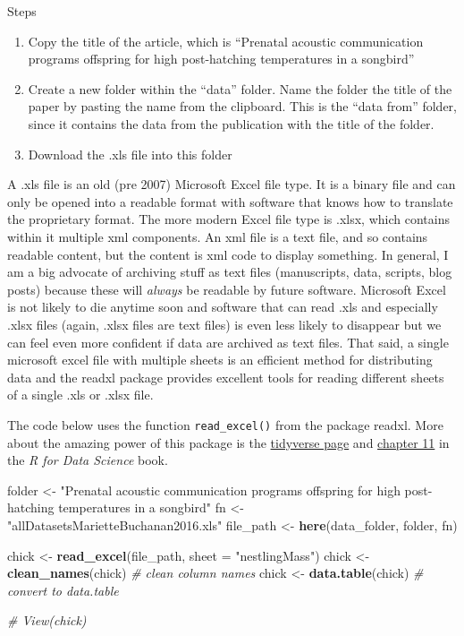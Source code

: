 \documentclass[]{book}
\newenvironment{Shaded}{\begin{snugshade}}{\end{snugshade}}
\newcommand{\CommentTok}[1]{\textcolor[rgb]{0.56,0.35,0.01}{\textit{#1}}}
\newcommand{\DataTypeTok}[1]{\textcolor[rgb]{0.13,0.29,0.53}{#1}}
\newcommand{\KeywordTok}[1]{\textcolor[rgb]{0.13,0.29,0.53}{\textbf{#1}}}
\newcommand{\NormalTok}[1]{#1}
\newcommand{\StringTok}[1]{\textcolor[rgb]{0.31,0.60,0.02}{#1}}
\providecommand{\tightlist}{%
  \setlength{\itemsep}{0pt}\setlength{\parskip}{0pt}}
\begin{document}
Steps

\begin{enumerate}
\def\labelenumi{\arabic{enumi}.}
\tightlist
\item
  Copy the title of the article, which is ``Prenatal acoustic communication programs offspring for high post-hatching temperatures in a songbird''
\item
  Create a new folder within the ``data'' folder. Name the folder the title of the paper by pasting the name from the clipboard. This is the ``data from'' folder, since it contains the data from the publication with the title of the folder.
\item
  Download the .xls file into this folder
\end{enumerate}

A .xls file is an old (pre 2007) Microsoft Excel file type. It is a binary file and can only be opened into a readable format with software that knows how to translate the proprietary format. The more modern Excel file type is .xlsx, which contains within it multiple xml components. An xml file is a text file, and so contains readable content, but the content is xml code to display something. In general, I am a big advocate of archiving stuff as text files (manuscripts, data, scripts, blog posts) because these will \emph{always} be readable by future software. Microsoft Excel is not likely to die anytime soon and software that can read .xls and especially .xlsx files (again, .xlsx files are text files) is even less likely to disappear but we can feel even more confident if data are archived as text files. That said, a single microsoft excel file with multiple sheets is an efficient method for distributing data and the readxl package provides excellent tools for reading different sheets of a single .xls or .xlsx file.

The code below uses the function \texttt{read\_excel()} from the package readxl. More about the amazing power of this package is the \href{https://readxl.tidyverse.org}{tidyverse page} and \href{http://r4ds.had.co.nz/data-import.html}{chapter 11} in the \emph{R for Data Science} book.

\begin{Shaded}
\begin{Highlighting}[]
\NormalTok{folder <-}\StringTok{ "Prenatal acoustic communication programs offspring for high post-hatching temperatures in a songbird"}
\NormalTok{fn <-}\StringTok{ "allDatasetsMarietteBuchanan2016.xls"}
\NormalTok{file_path <-}\StringTok{ }\KeywordTok{here}\NormalTok{(data_folder, folder, fn)}

\NormalTok{chick <-}\StringTok{ }\KeywordTok{read_excel}\NormalTok{(file_path, }
                    \DataTypeTok{sheet =} \StringTok{"nestlingMass"}\NormalTok{)}
\NormalTok{chick <-}\StringTok{ }\KeywordTok{clean_names}\NormalTok{(chick) }\CommentTok{# clean column names}
\NormalTok{chick <-}\StringTok{ }\KeywordTok{data.table}\NormalTok{(chick) }\CommentTok{# convert to data.table}

\CommentTok{# View(chick)}
\end{Highlighting}
\end{Shaded}
\end{document}
